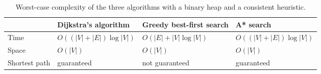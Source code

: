\begin{table}[htbp]
  \centering
  \caption{Worst-case complexity of the three algorithms with a binary heap and
    a consistent heuristic.}\label{tab:complexity}
  \renewcommand{\arraystretch}{1.25}%
  \begin{tabular}{@{}P{2.6cm}P{3.6cm}P{3.6cm}P{3.6cm}@{}}
    \toprule
     & \textcolor{algdijkstra}{\textbf{Dijkstra's algorithm}}
     & \textcolor{alggreedy}{\textbf{Greedy best-first search}}
     & \textcolor{algastar}{\textbf{A* search}}\\
    \midrule
    Time  & $O((|V|{+}|E|)\log|V|)$ & $O(|E| + |V|\log|V|)$
      & $O((|V|{+}|E|)\log|V|)$\\[2pt]
    Space & $O(|V|)$ & $O(|V|)$ & $O(|V|)$\\[2pt]
    Shortest path & \textcolor{algastar}{guaranteed}
      & \textcolor{cbRed}{not guaranteed} & \textcolor{algastar}{guaranteed}\\
    \bottomrule
  \end{tabular}
\end{table}
